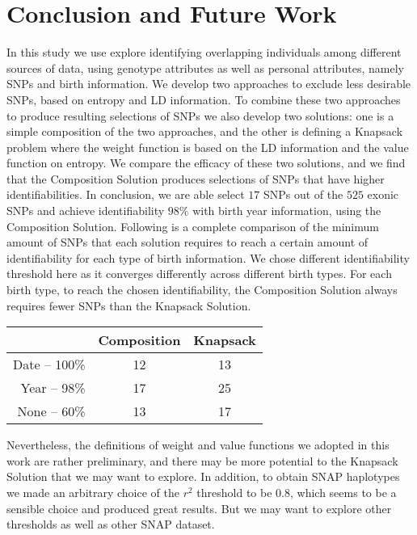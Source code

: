 \documentclass[14pt, oneside]{article}   	%
\begin{document}
\section{Conclusion and Future Work}
In this study we use explore identifying overlapping individuals among different sources of data,
using genotype attributes as well as personal attributes, namely SNPs and birth information.
We develop two approaches to exclude less desirable SNPs, based on entropy and LD information.
To combine these two approaches to produce resulting selections of SNPs we also develop two solutions:
one is a simple composition of the two approaches,
and the other is defining a Knapsack problem where the weight function is based on the LD information and the value function on entropy.
We compare the efficacy of these two solutions, and we find that the Composition Solution produces selections of SNPs that have higher identifiabilities.
In conclusion, we are able select $17$ SNPs out of the $525$ exonic SNPs and achieve identifiability $98\%$ with birth year information, using the Composition Solution.
Following is a complete comparison of the minimum amount of SNPs that each solution requires
to reach a certain amount of identifiability for each type of birth information.
We chose different identifiability threshold here as it converges differently across different birth types.
For each birth type, to reach the chosen identifiability, the Composition Solution always requires fewer SNPs than the Knapsack Solution.
\begin{center}
  \begin{tabular}{ | r | c | c |}
    \hline
                           & Composition & Knapsack \\ \hline
    Date -- 100\% & 12 & 13 \\ \hline
    Year -- 98\%   & 17 & 25 \\ \hline
    None -- 60\%  & 13 & 17 \\
    \hline
  \end{tabular}
\end{center}
Nevertheless, the definitions of weight and value functions we adopted in this work are rather preliminary,
and there may be more potential to the Knapsack Solution that we may want to explore.
In addition, to obtain SNAP haplotypes we made an arbitrary choice of the $r^2$ threshold to be $0.8$,
which seems to be a sensible choice and produced great results.
But we may want to explore other thresholds as well as other SNAP dataset.
%
%
%
%
%
%    
%
%
%
%
%
%
% 
%
%
%
%
%
%
%
%
%
%
%
%
%
%
%
%


%
\end{document}
